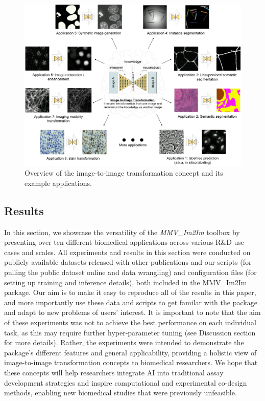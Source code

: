 \begin{figure}
\hypertarget{fig:overview}{%
\centering
\includegraphics[width=1\textwidth,height=0.53\textheight]{images/overview_figure.png}
\caption{Overview of the image-to-image transformation concept and its example applications.}\label{fig:overview}
}
\end{figure}

\hypertarget{results}{%
\subsection{Results}\label{results}}

In this section, we showcase the versatility of the \emph{MMV\_Im2Im} toolbox by presenting over ten different biomedical applications across various R\&D use cases and scales. All experiments and results in this section were conducted on publicly available datasets released with other publications and our scripts (for pulling the public dataset online and data wrangling) and configuration files (for setting up training and inference details), both included in the MMV\_Im2Im package. Our aim is to make it easy to reproduce all of the results in this paper, and more importantly use these data and scripts to get familar with the package and adapt to new problems of users' interest. It is important to note that the aim of these experiments was not to achieve the best performance on each individual task, as this may require further hyper-parameter tuning (see Discussion section for more details). Rather, the experiments were intended to demonstrate the package's different features and general applicability, providing a holistic view of image-to-image transformation concepts to biomedical researchers. We hope that these concepts will help researchers integrate AI into traditional assay development strategies and inspire computational and experimental co-design methods, enabling new biomedical studies that were previously unfeasible.

